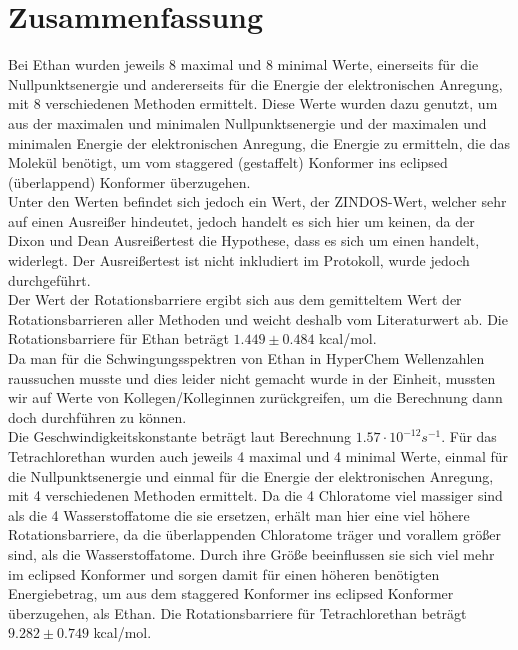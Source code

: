 \newpage
\section{Zusammenfassung}

Bei Ethan wurden jeweils 8 maximal und 8 minimal Werte, einerseits für die Nullpunktsenergie und andererseits für die Energie der elektronischen
Anregung, mit 8 verschiedenen Methoden ermittelt. Diese Werte wurden dazu genutzt, um aus der maximalen und minimalen Nullpunktsenergie und der 
maximalen und minimalen Energie der elektronischen Anregung, die Energie zu ermitteln, die das Molekül benötigt, um vom staggered (gestaffelt) 
Konformer ins eclipsed (überlappend) Konformer überzugehen. \\
Unter den Werten befindet sich jedoch ein Wert, der ZINDOS-Wert, welcher sehr auf einen Ausreißer hindeutet, jedoch handelt es sich hier um keinen, 
da der Dixon und Dean Ausreißertest die Hypothese, dass es sich um einen handelt, widerlegt. Der Ausreißertest ist nicht inkludiert im Protokoll, 
wurde jedoch durchgeführt. \\
Der Wert der Rotationsbarriere ergibt sich aus dem gemitteltem Wert der Rotationsbarrieren aller Methoden und weicht deshalb vom Literaturwert ab.
Die Rotationsbarriere für Ethan beträgt $1.449 \pm 0.484$ kcal/mol.\\
Da man für die Schwingungsspektren von Ethan in HyperChem Wellenzahlen raussuchen musste und dies leider nicht gemacht wurde in der Einheit,
mussten wir auf Werte von Kollegen/Kolleginnen zurückgreifen, um die Berechnung dann doch durchführen zu können. \\
Die Geschwindigkeitskonstante beträgt laut Berechnung $1.57 \cdot 10^{-12} s^{-1}$.
Für das Tetrachlorethan wurden auch jeweils 4 maximal und 4 minimal Werte, einmal für die Nullpunktsenergie und einmal für die Energie der elektronischen Anregung, mit 4 verschiedenen Methoden ermittelt. Da die 4 Chloratome viel massiger sind als die 4 Wasserstoffatome die sie ersetzen, erhält man hier eine viel höhere Rotationsbarriere, da die überlappenden Chloratome träger und vorallem größer sind, als die Wasserstoffatome. Durch ihre Größe beeinflussen sie sich viel mehr im eclipsed Konformer und sorgen damit für einen höheren benötigten Energiebetrag, um aus dem staggered Konformer ins eclipsed Konformer überzugehen, als Ethan.
Die Rotationsbarriere für Tetrachlorethan beträgt $9.282 \pm 0.749$ kcal/mol.

